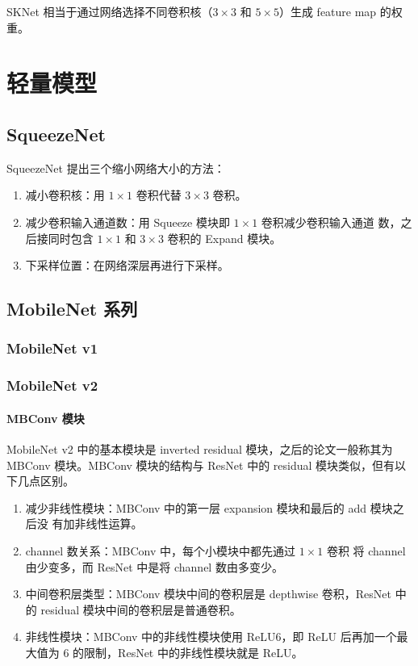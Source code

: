 SKNet 相当于通过网络选择不同卷积核（$3 \times 3$ 和 $5 \times 5$）生成 feature
map 的权重。

\chapter{轻量模型}
\section{SqueezeNet}
SqueezeNet\cite{2016-SqueezeNet} 提出三个缩小网络大小的方法：
\begin{enumerate}
  \item 减小卷积核：用 $1 \times 1$ 卷积代替 $3 \times 3$ 卷积。
  \item 减少卷积输入通道数：用 Squeeze 模块即 $1 \times 1$ 卷积减少卷积输入通道
    数，之后接同时包含 $1 \times 1$ 和 $3 \times 3$ 卷积的 Expand 模块。
  \item 下采样位置：在网络深层再进行下采样。
\end{enumerate}


\section{MobileNet 系列}
\subsection{MobileNet v1}

\subsection{MobileNet v2}\label{subsec:MobileNetv2}

\subsubsection{MBConv 模块}
MobileNet v2 中的基本模块是 inverted residual 模块，之后的论文一般称其为 MBConv
模块。MBConv 模块的结构与 ResNet 中的 residual 模块类似，但有以下几点区别。

\begin{enumerate}
  \item 减少非线性模块：MBConv 中的第一层 expansion 模块和最后的 add 模块之后没
    有加非线性运算。
  \item channel 数关系：MBConv 中，每个小模块中都先通过 $1 \times 1$ 卷积
    将 channel 由少变多，而 ResNet 中是将 channel 数由多变少。
  \item 中间卷积层类型：MBConv 模块中间的卷积层是 depthwise 卷积，ResNet 中的
    residual 模块中间的卷积层是普通卷积。
  \item 非线性模块：MBConv 中的非线性模块使用 ReLU6，即 ReLU 后再加一个最大值为
    6 的限制，ResNet 中的非线性模块就是 ReLU。
\end{enumerate}

